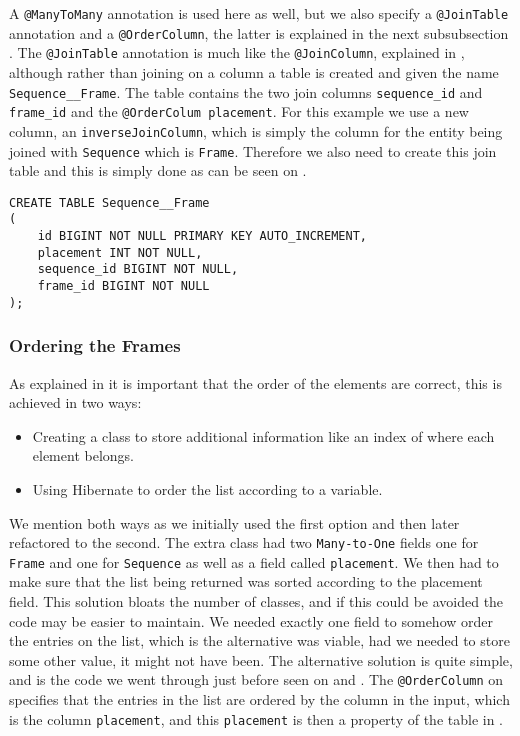 A \texttt{@ManyToMany} annotation is used here as well, but we also specify a \texttt{@JoinTable} annotation and a \texttt{@OrderColumn}, the latter is explained in the next subsubsection .
The \texttt{@JoinTable} annotation is much like the \texttt{@JoinColumn}, explained in , although rather than joining on a column a table is created and given the name \texttt{Sequence\_\_Frame}.
The table contains the two join columns \texttt{sequence\_id} and \texttt{frame\_id} and the \texttt{@OrderColum placement}.
For this example we use a new column, an \texttt{inverseJoinColumn}, which is simply the column for the entity being joined with \texttt{Sequence} which is \texttt{Frame}.
Therefore we also need to create this join table and this is simply done as can be seen on .

\begin{lstlisting}[float, floatplacement=h, caption={The table creation of the join table between \texttt{Sequence} and \texttt{Frame}.},label={lst:sql-frame-sequence}]
CREATE TABLE Sequence__Frame
(
    id BIGINT NOT NULL PRIMARY KEY AUTO_INCREMENT,
    placement INT NOT NULL,
    sequence_id BIGINT NOT NULL,
    frame_id BIGINT NOT NULL
);
\end{lstlisting}

\subsubsection{Ordering the Frames}\label{ss:order}
As explained in  it is important that the order of the elements are correct, this is achieved in two ways:
\begin{itemize}
	\item Creating a class to store additional information like an index of where each element belongs.
	\item Using Hibernate to order the list according to a variable.
\end{itemize}

We mention both ways as we initially used the first option and then later refactored to the second.
The extra class had two \texttt{Many-to-One} fields one for \texttt{Frame} and one for \texttt{Sequence} as well as a field called \texttt{placement}.
We then had to make sure that the list being returned was sorted according to the placement field.
This solution bloats the number of classes, and if this could be avoided the code may be easier to maintain.
We needed exactly one field to somehow order the entries on the list, which is the alternative was viable, had we needed to store some other value, it might not have been.
The alternative solution is quite simple, and is the code we went through just before seen on  and .
The \texttt{@OrderColumn} on  specifies that the entries in the list are ordered by the column in the input, which is the column \texttt{placement}, and this \texttt{placement} is then a property of the table in .